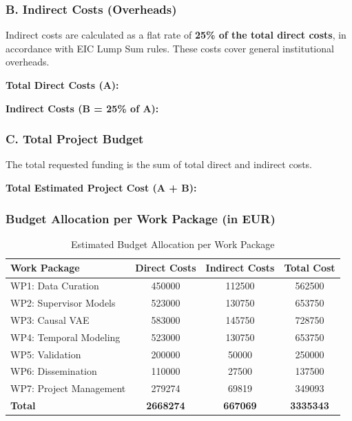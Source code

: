 \documentclass[11pt, a4paper]{article}
\begin{document}
\subsubsection*{B. Indirect Costs (Overheads)}
Indirect costs are calculated as a flat rate of \textbf{25\% of the total direct costs}, in accordance with EIC Lump Sum rules. These costs cover general institutional overheads.

\textbf{Total Direct Costs (A): }

\textbf{Indirect Costs (B = 25\% of A): }

\subsubsection*{C. Total Project Budget}
The total requested funding is the sum of total direct and indirect costs.

\textbf{Total Estimated Project Cost (A + B):} 

\subsubsection*{Budget Allocation per Work Package (in EUR)}

\begin{table}[H]
\centering
\caption{Estimated Budget Allocation per Work Package}
\label{tab:budget_wp}
\begin{tabular}{lS[table-format=7.0]S[table-format=6.0]S[table-format=7.0]}
\toprule
\textbf{Work Package} & {\textbf{Direct Costs}} & {\textbf{Indirect Costs}} & {\textbf{Total Cost}} \\
\midrule
WP1: Data Curation & 450000 & 112500 & 562500 \\
WP2: Supervisor Models & 523000 & 130750 & 653750 \\
WP3: Causal VAE & 583000 & 145750 & 728750 \\
WP4: Temporal Modeling & 523000 & 130750 & 653750 \\
WP5: Validation & 200000 & 50000 & 250000 \\
WP6: Dissemination & 110000 & 27500 & 137500 \\
WP7: Project Management & 279274 & 69819 & 349093 \\
\midrule
\textbf{Total} & {\textbf{2668274}} & {\textbf{667069}} & {\textbf{3335343}} \\
\bottomrule
\end{tabular}
\end{table}
\end{document}
